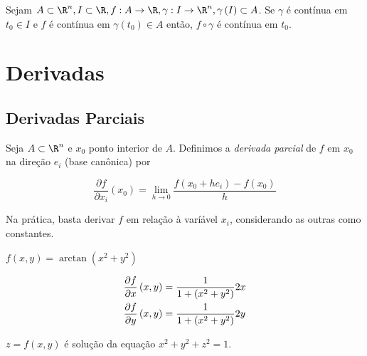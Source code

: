 \documentclass{book}
\begin{document}
\begin{teo}
    Sejam $A \subset \R^n ,I \subset \R,f:A \to \R,\gamma :I \to \R^n ,\gamma \left( I \right) \subset A$. Se $\gamma$ \'e cont\'inua em $t_0 \in I$ e $f$ \'e cont\'inua em $\gamma \left( {t_0 } \right) \in A$ ent\~ao, $f \circ \gamma$ \'e cont\'inua em $t_0$.

\end{teo}

\chapter{Derivadas} \label{chap03}

\section{Derivadas Parciais} \label{sec12}

\begin{defn}
    Seja $A \subset \R^n$ e $x_0$ ponto interior de $A$. Definimos a \textit{derivada parcial} de $f$ em $x_0$ na dire\c c\~ao $e_i$ (base can\^onica) por

\[\boxed{
    \frac{{\partial f}}{{\partial x_i }}\left( {x_0 } \right) = \mathop {\lim }\limits_{h \to 0} \frac{{f\left( {x_0  + he_i } \right) - f\left( {x_0 } \right)}}{h}}
\]

\end{defn}

Na pr\'atica, basta derivar $f$ em rela\c c\~ao \`a var\'i\'avel $x_i$, considerando as outras como constantes.

\begin{ex}
$f\left( {x,y} \right) = \arctan \left( {x^2  + y^2 } \right)$
\end{ex}

\begin{sol}
\[
\begin{gathered}
\frac{{\partial f}}
{{\partial x}}\left( {x,y} \right) = \frac{1}
{{1 + \left( {x^2  + y^2 } \right)}}2x \hfill \\
\frac{{\partial f}}
{{\partial y}}\left( {x,y} \right) = \frac{1}
{{1 + \left( {x^2  + y^2 } \right)}}2y \hfill \\
\end{gathered}
\]
\end{sol}

\begin{ex}
$z = f\left( {x,y} \right)$ \'e solu\c c\~ao da equa\c c\~ao $x^2  + y^2  + z^2  = 1$.
\end{ex}
\end{document}
